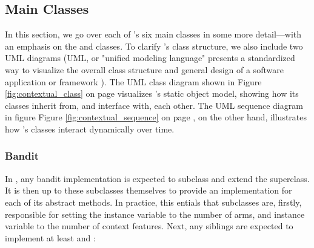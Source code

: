 \documentclass{jss}
\begin{document}
\subsection{Main Classes} \label{mainclasses}

In this section, we go over each of 's six main classes in some more detail---with an emphasis on the  and  classes. To clarify 's class structure, we also include two UML diagrams (UML, or "unified modeling language" presents a standardized way to visualize the overall class structure and general design of a software application or framework \citep{Rumbaugh2004}). The UML class diagram shown in Figure \ref{fig:contextual_class} on page \pageref{fig:contextual_class} visualizes 's static object model, showing how its classes inherit from, and interface with, each other. The UML sequence diagram in figure Figure \ref{fig:contextual_sequence} on page \pageref{fig:contextual_sequence}, on the other hand, illustrates how 's classes interact dynamically over time.

\subsubsection{Bandit}

In , any bandit implementation is expected to subclass and extend the  superclass. It is then up to these subclasses themselves to provide an implementation for each of its abstract methods. In practice, this entials that  subclasses are, firstly, responsible for setting the instance variable  to the number of arms, and instance variable  to the number of context features. Next, any  siblings are expected to implement at least  and :

\end{document}

